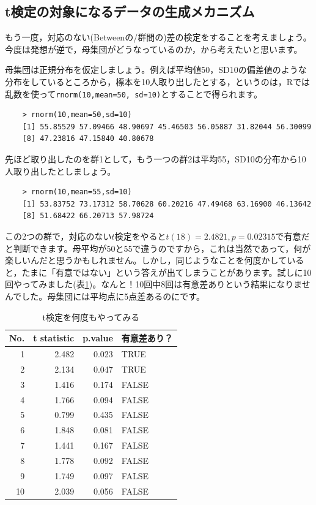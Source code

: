 \documentclass{ltjsarticle}
\begin{document}
\subsection{t検定の対象になるデータの生成メカニズム}
もう一度，対応のない(Betweenの/群間の)差の検定をすることを考えましょう。今度は発想が逆で，母集団がどうなっているのか，から考えたいと思います。

母集団は正規分布を仮定しましょう。例えば平均値50，SD10の偏差値のような分布をしているところから，標本を10人取り出したとする，というのは，Rでは乱数を使って\texttt{rnorm(10,mean=50, sd=10)}とすることで得られます。

\begin{tcolorbox}
    \begin{verbatim}
    > rnorm(10,mean=50,sd=10)
    [1] 55.85529 57.09466 48.90697 45.46503 56.05887 31.82044 56.30099 
    [8] 47.23816 47.15840 40.80678\end{verbatim}
\end{tcolorbox}

先ほど取り出したのを群1として，もう一つの群2は平均55，SD10の分布から10人取り出したとしましょう。

\begin{tcolorbox}
    \begin{verbatim}
    > rnorm(10,mean=55,sd=10)
    [1] 53.83752 73.17312 58.70628 60.20216 47.49468 63.16900 46.13642 
    [8] 51.68422 66.20713 57.98724\end{verbatim}
\end{tcolorbox}

この2つの群で，対応のない$t$検定をやると$t(18)=2.4821,p=0.02315$で有意だと判断できます。母平均が50と55で違うのですから，これは当然であって，何が楽しいんだと思うかもしれません。しかし，同じようなことを何度かしていると，たまに「有意ではない」という答えが出てしまうことがあります。試しに10回やってみました(表\ref{tbl::19_03})。なんと！10回中8回は有意差ありという結果になりませんでした。母集団には平均点に5点差あるのにです。

\begin{table}[ht]
    \centering
    \caption{t検定を何度もやってみる} 
    \begin{tabular}{rrrl}
      \hline
  No.   & t statistic & p.value & 有意差あり？ \\ 
      \hline
    1 & 2.482 & 0.023 & TRUE \\ 
      2 & 2.134 & 0.047 & TRUE \\ 
      3 & 1.416 & 0.174 & FALSE \\ 
      4 & 1.766 & 0.094 & FALSE \\ 
      5 & 0.799 & 0.435 & FALSE \\ 
      6 & 1.848 & 0.081 & FALSE \\ 
      7 & 1.441 & 0.167 & FALSE \\ 
      8 & 1.778 & 0.092 & FALSE \\ 
      9 & 1.749 & 0.097 & FALSE \\ 
      10 & 2.039 & 0.056 & FALSE \\ 
       \hline
    \end{tabular}
    \label{tbl::19_03}
\end{table}
\end{document}
